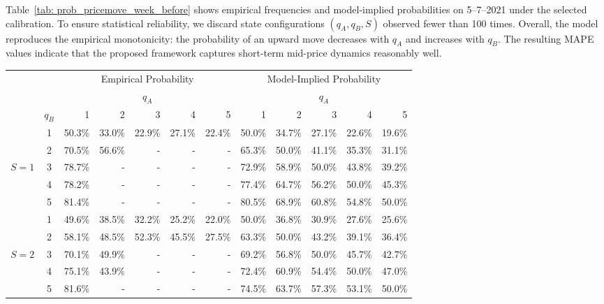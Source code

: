 \documentclass[11pt]{article}
\begin{document}
Table~\ref{tab: prob_pricemove_week_before} shows empirical frequencies and model-implied probabilities on 5--7--2021 under the selected calibration. To ensure statistical reliability, we discard state configurations $(q_A,q_B,S)$ observed fewer than 100 times. Overall, the model reproduces the empirical monotonicity: the probability of an upward move decreases with $q_A$ and increases with $q_B$. The resulting MAPE values indicate that the proposed framework captures short-term mid-price dynamics reasonably well.



{\captionsetup{font=small}
\begin{table}[!htbp]
    \centering
        \begin{adjustbox}{max width=\textwidth}
            \begin{tabular}{c c r r r r r |r r r r r}\toprule
             & &\multicolumn{5}{c}{Empirical Probability}& \multicolumn{5}{c}{Model-Implied Probability}  \\ \cmidrule{3-12}
              & &\multicolumn{5}{c}{$q_A$}& \multicolumn{5}{c}{$q_A$}  \\ \cmidrule{3-12}
             & $q_B$ & 1 & 2 & 3 & 4 & 5 & 1 & 2 & 3 & 4 & 5 \\ \midrule
             & 1 & 50.3\% & 33.0\% & 22.9\% & 27.1\% & 22.4\% & 50.0\% & 34.7\% & 27.1\% & 22.6\% & 19.6\% \\
             & 2 &70.5\% & 56.6\% & - & - & - & 65.3\% & 50.0\% & 41.1\% & 35.3\% & 31.1\% \\
             $S=1$ & 3 & 78.7\% & - & - & - & - & 72.9\% & 58.9\% & 50.0\% & 43.8\% & 39.2\%\\
             & 4 & 78.2\% & - & - & - & - & 77.4\% & 64.7\% & 56.2\% & 50.0\% & 45.3\%\\
             & 5 & 81.4\% & - & - & - & - & 80.5\% & 68.9\% & 60.8\% & 54.8\% & 50.0\%\\ \midrule
             & 1 & 49.6\% & 38.5\% & 32.2\% & 25.2\% & 22.0\% & 50.0\% & 36.8\% & 30.9\% & 27.6\% & 25.6\%\\
             & 2 & 58.1\% & 48.5\% & 52.3\% & 45.5\% & 27.5\% & 63.3\% & 50.0\% & 43.2\% & 39.1\% & 36.4\%\\
             $S=2$ & 3 & 70.1\% & 49.9\% & - & - & - & 69.2\% & 56.8\% & 50.0\% & 45.7\% & 42.7\%\\
             & 4 & 75.1\% & 43.9\% & - & - & - & 72.4\% & 60.9\% & 54.4\% & 50.0\% & 47.0\%\\
             & 5 & 81.6\% & - & - & - & - & 74.5\% & 63.7\% & 57.3\% & 53.1\% & 50.0\%\\ \midrule

\end{tabular}
\end{adjustbox}
\end{table}}
\end{document}
